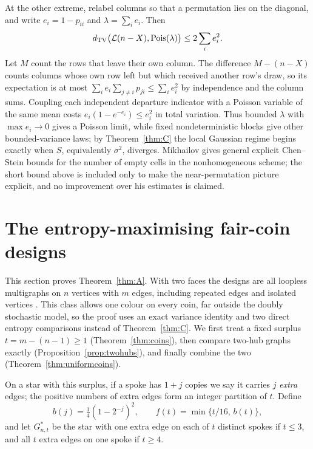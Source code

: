 \documentclass[11pt,a4paper]{article}
\theoremstyle{definition}\newtheorem{remark}[theorem]{Remark}\newtheorem{conjecture}{Conjecture}
\begin{document}
At the other extreme, relabel columns so that a permutation lies on the diagonal, and write $e_i=1-p_{ii}$ and $\lambda=\sum_ie_i$. Then
\[
 d_{\rm TV}\big(\mathcal L(n-X),\operatorname{Pois}(\lambda)\big)\le2\sum_i e_i^2 .
\]
Let $M$ count the rows that leave their own column. The difference $M-(n-X)$ counts columns whose own row left but which received another row's draw, so its expectation is at most $\sum_ie_i\sum_{j\ne i}p_{ji}\le\sum_ie_i^2$ by independence and the column sums. Coupling each independent departure indicator with a Poisson variable of the same mean costs $e_i(1-e^{-e_i})\le e_i^2$ in total variation. Thus bounded $\lambda$ with $\max e_i\to0$ gives a Poisson limit, while fixed nondeterministic blocks give other bounded-variance laws; by Theorem~\ref{thm:C} the local Gaussian regime begins exactly when $S$, equivalently $\sigma^2$, diverges. Mikhailov \cite[Theorem~1]{mik} gives general explicit Chen--Stein bounds for the number of empty cells in the nonhomogeneous scheme; the short bound above is included only to make the near-permutation picture explicit, and no improvement over his estimates is claimed.

\section{The entropy-maximising fair-coin designs}\label{sec:coins}
This section proves Theorem~\ref{thm:A}. With two faces the designs are all loopless multigraphs on $n$ vertices with $m$ edges, including repeated edges and isolated vertices \cite[p.~122]{pelekis}. This class allows one colour on every coin, far outside the doubly stochastic model, so the proof uses an exact variance identity and two direct entropy comparisons instead of Theorem~\ref{thm:C}. We first treat a fixed surplus $t=m-(n-1)\ge1$ (Theorem~\ref{thm:coins}), then compare two-hub graphs exactly (Proposition~\ref{prop:twohubs}), and finally combine the two (Theorem~\ref{thm:uniformcoins}).

On a star with this surplus, if a spoke has $1+j$ copies we say it carries $j$ \emph{extra} edges; the positive numbers of extra edges form an integer partition of $t$. Define
\[
 b(j)=\tfrac14(1-2^{-j})^2,\qquad
 f(t)=\min\{t/16,\,b(t)\},
\]
and let $G_{n,t}^*$ be the star with one extra edge on each of $t$ distinct spokes if $t\le3$, and all $t$ extra edges on one spoke if $t\ge4$.
\end{document}
